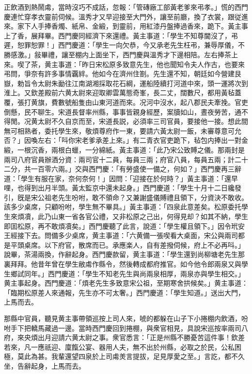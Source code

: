 正飲酒到熱鬧䖏，當時沒巧不成話，忽報：「管磚廠工部黃老爹來弔孝。」慌的西門慶連忙穿孝衣靈前伺候。溫秀才又早迎接至大門外，讓至前廳，換了衣裳，跟従進來。家下人手捧香燭、紙帛、金緞，到靈前，用紅漆丹盤捧過香來，跪下。黃主事上了香，展拜畢。西門慶同經濟下來還禮。黃主事道：「學生不知尊閫沒了，弔遲，恕罪恕罪！」西門慶道：「學生一向欠恭，今又承老先生枉弔，兼辱厚儀，不勝感激。」敍畢禮，讓至棚内上面坐下，西門慶與溫秀才下邊相陪。左右捧茶上來。喫了茶，黄主事道：「昨日宋松原多致意先生，他也聞知令夫人作古，也要來弔問，爭奈有許多事情覊絆。他如今在濟州住劄。先生還不知，朝廷如今營建艮嶽，勅旨令太尉朱勔往江南湖湘採取花石綱，運船陸續打河道中來，頭一運將次到淮上。又欽差殿前六黄太尉來迎取卿雲萬態奇峯，長二丈，闊數尺，都用黃毡蓋覆，張打黄旗，費數號船隻由山東河道而來。况河中沒水，起八郡民夫牽挽。官吏倒懸，民不聊生。宋道長督率州縣，事事皆親身經歷，案牘如山，晝夜勞苦，通不得閒。况黄太尉不久自京而至，宋道長説，必須率三司官員，要接他一接。想此間無可相熟者，委托學生來，敬煩尊府作一東，要請六黃太尉一飯，未審尊意可允否？」因喚左右：「呌你宋老爹承差上來。」有二青衣官吏跪下，毡包内捧出一對金緞，一根沉香，兩根白蠟，一分綿紙。黃主事道：「此乃宋公致賻之儀。那兩封是兩司八府官員辦酒分資：兩司官十二員，每員三兩；府官八員，每員五兩；計二十二分，共一百零六兩。」交與西門慶：「有勞盛使一備之，何如？」西門慶再三辭道：「學生有服在家，奈何奈何！」因問：「迎接在於何時？」黃主事道：「還早哩，也得到出月半頭。黃太監京中還未起身。」西門慶道：「學生十月十二日纔發引，旣是宋公祖老先生吩咐，敢不領命？又兼謝盛儀賻禮且領下，分資決不敢收。該多少桌席，只顧吩咐，學生無不畢具。」黃主事道：「四泉此意差矣。松原委托學生來煩凟，此乃山東一省各官公禮，又非松原之己出，何得見却？如其不納，學生即囬松原，再不敢煩凟矣。」西門慶聽了此言，說道：「學生權且領下。」因令玳安王經接下去。問備多少桌席，黄主事道：「六黄備一張喫看大桌面，宋公與兩司都是平頭桌席。以下府官，散席而已。承應楽人，自有差撥伺候，府上不必再呌。」說畢，茶湯兩換，作辭起身。西門慶款留，黄主事道：「學生還到尚柳塘老先生那裏拜拜。他昔年曾在學生敝䖏作縣令，然後轉成都府推官。如今他令郎兩泉又與學生鄉試同年。」西門慶道：「學生不知老先生與尚兩泉相厚，兩泉亦與學生相交。」黄主事起身。西門慶道：「煩老先生多致意宋公祖，至期寒舍拱候矣。」黄主事道：「臨期松原差人來通報，先生亦不可太奢。」西門慶道：「學生知道。」送出大門，上馬而去。

那縣中官員，聽見黄主事帶領巡按上司人來，唬的都躲在山子下小捲棚内飲酒，吩咐手下把轎馬藏過一邊。當時西門慶回到捲棚，與衆官相見，具說宋巡按率兩司八府，來央煩出月迎請六黄太尉之事。衆官悉言：「正是州縣不勝憂苦這件事！欽差若來，凡一應祇迎、廩餼公宴、器用人夫，無不出於州縣，必取之於民，公私困極，莫此為甚。我輩還望四泉於上司䖏羙言提拔，足見厚愛之至。」言訖，都不久坐，告辭起身，上馬而去。

